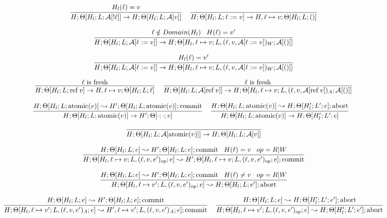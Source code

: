 \documentclass[9pt]{article}
\newcommand{\aeval}[1]{\mathcal{A}[#1]}
\newcommand{\loc}[0]{\ell}
\newcommand{\atomic}[1]{\text{atomic}(#1)}
\newcommand{\alloc}[1]{\text{ref} \; #1}
\newcommand{\commit}[0]{\text{commit}}
\newcommand{\abort}[0]{\text{abort}}
\begin{document}
\[%
\infer[]{H; \Theta[H_l; L; \aeval{!\loc}] \rightarrow H; \Theta[H_l; L; \aeval{v}]}{H_l(\loc) = v } \;\;\;
\infer[]{H; \Theta[H_l; L; \loc := v] \rightarrow H, \loc \mapsto v; \Theta[H_l; L; ()]}{}
\]

\[%
\infer[]{H; \Theta[H_l; L; \aeval{\loc := v}] \rightarrow H; \Theta[H_l, \loc \mapsto v; L, (\loc, v, \aeval{\loc := v})_W; \aeval{()}]}{\loc \notin Domain(H_l) \;\;\; H(\loc) = v'} 
\]

\[%
\infer[]{H; \Theta[H_l; L; \aeval{\loc := v}] \rightarrow H; \Theta[H_l, \loc \mapsto v; L, (\loc,v,\aeval{\loc := v})_W; \aeval{()}]}{H_l(\loc) = v'} 
\]

\[%
\infer[]{H; \Theta[H_l; L; \alloc{v}] \rightarrow H, \loc \mapsto v; \Theta[H_l; L; \loc]}{\loc \text{ is fresh}} \;\;\;
\infer[]{H; \Theta[H_l; L; \aeval{\alloc{v}}] \rightarrow H; \Theta[H_l, \loc \mapsto v; L, (\loc, v, \aeval{\alloc{v}})_A;  \aeval{()}]}{\loc \text{ is fresh}}
\]

\[%
\infer[]{H; \Theta[H_l; L; \atomic{v}] \rightarrow H'; \Theta[\cdot;\cdot; v]}{H; \Theta[H_l; L; \atomic{v}] \leadsto H'; \Theta[H_l; L; \atomic{v}]; \commit} \;\;\;
\infer[]{H; \Theta[H_l; L; \atomic{v}] \rightarrow H; \Theta[H_l'; L'; e]}{H; \Theta[H_l; L; \atomic{v}] \leadsto H; \Theta[H_l'; L'; e]; \abort} \;\;\;
\]

\[%
\infer[]{H; \Theta[H_l; L; \aeval{\atomic{v}}] \rightarrow H; \Theta[H_l; L; \aeval{v}]}{}
\]

\boxed{H; \Theta[H_l; L; e] \leadsto H', \Theta[H_l'; L'; e']; (\abort | \commit)}

\[%
\infer[]{H; \Theta[H_l, \loc \mapsto v; L, (\loc,v,e')_{op}; e] \leadsto H'; \Theta[H_l, \loc \mapsto v; L, (\loc, v, e')_{op};e]; \commit}{H; \Theta[H_l; L; e] \leadsto H'; \Theta[H_l; L; e]; \commit \;\;\; H(\loc) = v \;\;\; op = R|W}
\]

\[%
\infer[]{H; \Theta[H_l, \loc \mapsto v'; L, (\loc,v,e')_{op}; e] \leadsto H; \Theta[H_l; L; e']; \abort}{H; \Theta[H_l; L; e] \leadsto H'; \Theta[H_l; L; e]; \commit \;\;\; H(\loc) \not= v \;\;\; op=R|W} 
\]

\[%
\infer[]{H; \Theta[H_l, \loc \mapsto v'; L, (\loc,v,e')_A; e] \leadsto H', \loc \mapsto v'; L, (\loc,v,e')_A; e]; \commit}{H; \Theta[H_l; L; e] \leadsto H'; \Theta[H_l; L; e]; \commit} \;\;\;
\infer[]{H; \Theta[H_l, \loc \mapsto v'; L, (\loc,v,e')_{op}; e] \leadsto H; \Theta[H_l'; L'; e']; \abort}{H; \Theta[H_l; L; e] \leadsto H; \Theta[H_l'; L'; e']; \abort} 
\]

\endgroup
\end{document}
